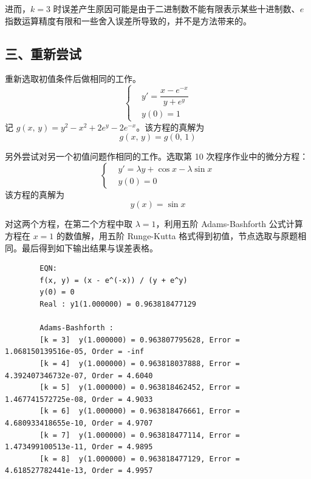 \documentclass{ctexart}
\begin{document}
		进而，$k = 3$ 时误差产生原因可能是由于二进制数不能有限表示某些十进制数、$e$ 指数运算精度有限和一些舍入误差所导致的，并不是方法带来的。
		
		
	\subsection*{三、重新尝试}
	\noindent 重新选取初值条件后做相同的工作。
	\begin{equation}
	\left\{\begin{aligned}
		& y' = \dfrac{x − e^{−x}}{y + e^y}\\
		& y(0) = 1
	\end{aligned}\right.
	\end{equation}
	记 $g(x,\,y) = y^2 − x^2 + 2e^y − 2e^{−x}$。该方程的真解为
	\begin{equation}
		g(x,\,y) = g(0,\,1)
	\end{equation}
	
	\noindent 另外尝试对另一个初值问题作相同的工作。选取第 10 次程序作业中的微分方程：
	\begin{equation}
		\left\{\begin{aligned}
		& y' = \lambda y + \cos x - \lambda \sin x\\
		& y(0) = 0
		\end{aligned}\right.
	\end{equation}
	该方程的真解为
	\begin{equation}
		y(x) = \sin x
	\end{equation}
	
	对这两个方程，在第二个方程中取 $\lambda = 1$，利用五阶 Adams-Bashforth 公式计算方程在 $x = 1$ 的数值解，用五阶 Runge-Kutta 格式得到初值，节点选取与原题相同。最后得到如下输出结果与误差表格。
	\begin{verbatim}
		EQN:
		f(x, y) = (x - e^(-x)) / (y + e^y)
		y(0) = 0
		Real : y1(1.000000) = 0.963818477129
		
		Adams-Bashforth :
		[k = 3]  y(1.000000) = 0.963807795628, Error = 1.068150139516e-05, Order = -inf
		[k = 4]  y(1.000000) = 0.963818037888, Error = 4.392407346732e-07, Order = 4.6040
		[k = 5]  y(1.000000) = 0.963818462452, Error = 1.467741572725e-08, Order = 4.9033
		[k = 6]  y(1.000000) = 0.963818476661, Error = 4.680933418655e-10, Order = 4.9707
		[k = 7]  y(1.000000) = 0.963818477114, Error = 1.473499100513e-11, Order = 4.9895
		[k = 8]  y(1.000000) = 0.963818477129, Error = 4.618527782441e-13, Order = 4.9957
	\end{verbatim}
	
\end{document}
